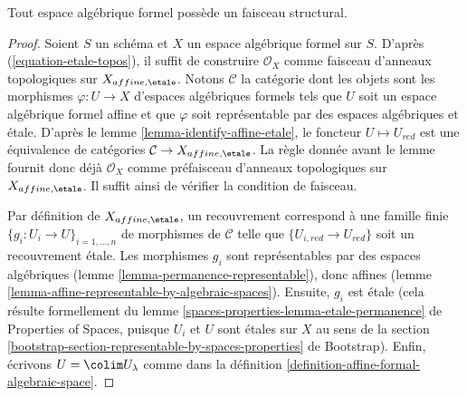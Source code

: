 \begin{lemma}
\label{lemma-structure-sheaf}
Tout espace algébrique formel possède un faisceau structural.
\end{lemma}

\begin{proof}
Soient $S$ un schéma et $X$ un espace algébrique formel sur $S$.
D'après (\ref{equation-etale-topos}), il suffit de construire $\mathcal{O}_X$
comme faisceau d'anneaux topologiques sur $X_{affine, \etale}$.
Notons $\mathcal{C}$ la catégorie dont les objets
sont les morphismes $\varphi : U \to X$ d'espaces algébriques formels tels que
$U$ soit un espace algébrique formel affine et que
$\varphi$ soit représentable par des espaces algébriques et \'etale.
D'après le lemme \ref{lemma-identify-affine-etale},
le foncteur $U \mapsto U_{red}$ est une équivalence de catégories
$\mathcal{C} \to X_{affine, \etale}$. La règle donnée
avant le lemme fournit donc déjà $\mathcal{O}_X$ comme préfaisceau
d'anneaux topologiques sur $X_{affine, \etale}$. Il suffit ainsi de vérifier
la condition de faisceau.

\medskip\noindent
Par définition de $X_{affine, \etale}$, un recouvrement correspond à une famille finie
$\{g_i : U_i \to U\}_{i = 1, \ldots, n}$ de morphismes de $\mathcal{C}$
telle que $\{U_{i, red} \to U_{red}\}$ soit un recouvrement \'etale.
Les morphismes $g_i$ sont représentables par des espaces algébriques
(lemme \ref{lemma-permanence-representable}), donc affines
(lemme \ref{lemma-affine-representable-by-algebraic-spaces}).
Ensuite, $g_i$ est \'etale (cela résulte formellement du
lemme \ref{spaces-properties-lemma-etale-permanence} de Properties of Spaces,
puisque $U_i$ et $U$ sont \'etales sur $X$ au sens de la
section \ref{bootstrap-section-representable-by-spaces-properties} de Bootstrap).
Enfin, écrivons $U = \colim U_\lambda$ comme dans la
définition \ref{definition-affine-formal-algebraic-space}.


\end{proof}
